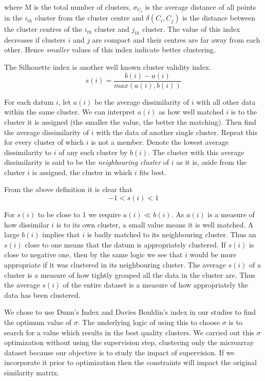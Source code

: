 where M is the total number of clusters, $\sigma_{C_{i}}$ is the average distance of all points in the $i_{th}$ cluster from the cluster centre and $\delta(C_{i},C_{j})$ is the distance between the cluster centres of the $i_{th}$ cluster and $j_{th}$ cluster. The value of this index decreases if clusters $i$ and $j$ are compact and their centres are far away from each other. Hence \textit{smaller} values of this index indicate better clustering.

The Silhouette index is another well known cluster validity index.
\[
s(i)=\frac{b(i)-a(i)}{max(a(i),b(i))} 
\]

For each datum $i$, let $a(i)$ be the average dissimilarity of $i$ with all other data within the same cluster. We can interpret $a(i)$ as how well matched $i$ is to the cluster it 
is assigned (the smaller the value, the better the matching). Then find the average dissimilarity of $i$ with the data of another single cluster. Repeat this for every cluster of 
which $i$ is not a member. Denote the lowest average dissimilarity to $i$ of any such cluster by $b(i)$. The cluster with this average dissimilarity is said to be the 
\textit{neighbouring cluster} of $i$ as it is, aside from the cluster $i$ is assigned, the cluster in which $i$ fits best.

From the above definition it is clear that
\[
-1<s(i)<1 
\]

For $s(i)$ to be close to 1 we require $a(i) \ll b(i)$. As $a(i)$ is a measure of how dissimilar $i$ is to its own cluster, a small value means it is well matched. 
A large $b(i)$ implies that $i$ is badly matched to its neighbouring cluster. Thus an $s(i)$ close to one means that the datum is appropriately clustered. If $s(i)$ is close to 
negative one, then by the same logic we see that $i$ would be more appropriate if it was clustered in its neighbouring cluster. The average $s(i)$ of a cluster is a measure of how tightly grouped all the 
data in the cluster are. Thus the average $s(i)$ of the entire dataset is a measure of how appropriately the data has been clustered. 

We chose to use Dunn's Index and Davies Bouldin's index in our studies to find the optimum value of $\sigma$.  The underlying logic of using this to choose $\sigma$ is to search for a value which results in the best quality clusters. 
We carried out this $\sigma$ optimization without using the supervision step, clustering only the microarray dataset because our objective is to study the impact of supervision. 
If we incorporate it prior to optimization then the constraints will impact the original similarity matrix.

